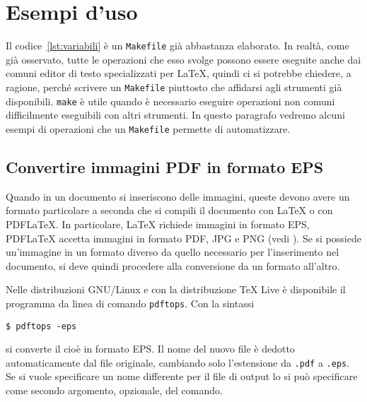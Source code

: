 \cleardoublepage{}
\chapter{Esempi d'uso}
\label{cha:esempi}

Il codice~\ref{lst:variabili} è un \texttt{Makefile} già abbastanza elaborato.
In realtà, come già osservato, tutte le operazioni che esso svolge possono
essere eseguite anche dai comuni editor di testo specializzati per \LaTeX{},
quindi ci si potrebbe chiedere, a ragione, perché scrivere un \texttt{Makefile}
piuttosto che affidarsi agli strumenti già disponibili.  \texttt{make} è utile
quando è necessario eseguire operazioni non comuni difficilmente eseguibili con
altri strumenti.  In questo paragrafo vedremo alcuni esempi di operazioni che un
\texttt{Makefile} permette di automatizzare.

\section{Convertire immagini \textsc{PDF} in formato \textsc{EPS}}
\label{sec:immagini-eps}

Quando in un documento si inseriscono delle immagini, queste devono avere un
formato particolare a seconda che si compili il documento con \LaTeX{}
o con \textsc{PDF}\LaTeX.  In particolare, \LaTeX{}
richiede immagini in formato \textsc{EPS}, \textsc{PDF}\LaTeX{}
accetta immagini in formato \textsc{PDF}, \textsc{JPG} e \textsc{PNG} (vedi
\cite[pagina 105]{pantieri:latex}).  Se si possiede un'immagine in un formato
diverso da quello necessario per l'inserimento nel documento, si deve quindi
procedere alla conversione da un formato all'altro.

Nelle distribuzioni GNU/Linux e con la distribuzione TeX Live è disponibile il
programma da linea di comando \texttt{pdftops}. Con la sintassi
\begin{sintassi}
  \small \texttt{\$ pdftops -eps}  
\end{sintassi}
si converte il cioè  in formato \textsc{EPS}.  Il nome del nuovo
file è dedotto automaticamente dal file originale, cambiando solo l'estensione
da \texttt{.pdf} a \texttt{.eps}.  Se si vuole specificare un nome differente
per il file di output lo si può specificare come secondo argomento, opzionale,
del comando.

